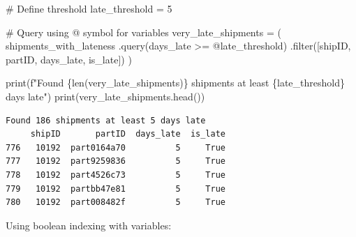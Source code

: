 \documentclass[
  letterpaper,
  DIV=11,
  numbers=noendperiod]{scrartcl}
\newenvironment{Shaded}{\begin{snugshade}}{\end{snugshade}}
\newcommand{\BuiltInTok}[1]{\textcolor[rgb]{0.00,0.23,0.31}{#1}}
\newcommand{\CommentTok}[1]{\textcolor[rgb]{0.37,0.37,0.37}{#1}}
\newcommand{\DecValTok}[1]{\textcolor[rgb]{0.68,0.00,0.00}{#1}}
\newcommand{\NormalTok}[1]{\textcolor[rgb]{0.00,0.23,0.31}{#1}}
\newcommand{\OperatorTok}[1]{\textcolor[rgb]{0.37,0.37,0.37}{#1}}
\newcommand{\SpecialCharTok}[1]{\textcolor[rgb]{0.37,0.37,0.37}{#1}}
\newcommand{\SpecialStringTok}[1]{\textcolor[rgb]{0.13,0.47,0.30}{#1}}
\newcommand{\StringTok}[1]{\textcolor[rgb]{0.13,0.47,0.30}{#1}}
\begin{document}
\begin{Shaded}
\begin{Highlighting}[]
\CommentTok{\# Define threshold}
\NormalTok{late\_threshold }\OperatorTok{=} \DecValTok{5}

\CommentTok{\# Query using @ symbol for variables}
\NormalTok{very\_late\_shipments }\OperatorTok{=}\NormalTok{ (}
\NormalTok{    shipments\_with\_lateness}
\NormalTok{    .query(}\StringTok{\textquotesingle{}days\_late \textgreater{}= @late\_threshold\textquotesingle{}}\NormalTok{)}
\NormalTok{    .}\BuiltInTok{filter}\NormalTok{([}\StringTok{\textquotesingle{}shipID\textquotesingle{}}\NormalTok{, }\StringTok{\textquotesingle{}partID\textquotesingle{}}\NormalTok{, }\StringTok{\textquotesingle{}days\_late\textquotesingle{}}\NormalTok{, }\StringTok{\textquotesingle{}is\_late\textquotesingle{}}\NormalTok{])}
\NormalTok{)}

\BuiltInTok{print}\NormalTok{(}\SpecialStringTok{f"Found }\SpecialCharTok{\{}\BuiltInTok{len}\NormalTok{(very\_late\_shipments)}\SpecialCharTok{\}}\SpecialStringTok{ shipments at least }\SpecialCharTok{\{}\NormalTok{late\_threshold}\SpecialCharTok{\}}\SpecialStringTok{ days late"}\NormalTok{)}
\BuiltInTok{print}\NormalTok{(very\_late\_shipments.head())}
\end{Highlighting}
\end{Shaded}

\begin{verbatim}
Found 186 shipments at least 5 days late
     shipID       partID  days_late  is_late
776   10192  part0164a70          5     True
777   10192  part9259836          5     True
778   10192  part4526c73          5     True
779   10192  partbb47e81          5     True
780   10192  part008482f          5     True
\end{verbatim}

Using boolean indexing with variables:
\end{document}
